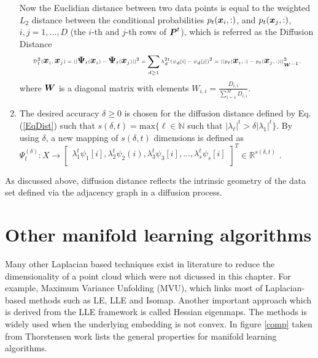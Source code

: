 \begin{enumerate}
{Now the Euclidian distance between two data points is equal to the weighted $L_2$ distance between the conditional probabilities ${{p}_t({\mbox{\boldmath $x$}}_i,:)}$, and ${{p}_t({\mbox{\boldmath $x$}}_j,:)}$, $i,j=1,...,D$ (the $i$-th and $j$-th rows of ${\mbox{\boldmath $P$}}^t$), which is referred as the Diffusion Distance
			\begin{equation}{ \label{EqDist} { {\cal{D}}^2_t( \myvec{x}_i,\myvec{x}_j)=||{\mymat{\Psi}_t{(\myvec{x}_i)}}-{\mymat{\Psi}_t{(\myvec{x}_j)}}||^2={  \sum_{d\geq{1}} {\lambda}^{2t}_d (\psi_d[i]-\psi_d[j])^2 }}=\\
			||{p_t}(\myvec{x}_i,:)-{p_t}(\myvec{x}_j,:)||^2_{\tiny\mymat{W}^{-1}}},
			\end{equation}
			where ${\mbox{\boldmath $W$}}$ is a diagonal matrix with elements
			$W_{i,i}=\frac{D_{i,i}}{\sum_{i=1}^M D_{i,i}}$.}
	\item{The desired accuracy $\delta \geq 0$ is chosen for the diffusion distance defined by Eq. (\ref{EqDist}) such that
		$s(\delta,t)=\text{max} \{\ell\in \mathbb{N}$  such that   $|\lambda_{\ell}|^t > \delta |\lambda_1|^t \}  $. By using $\delta$, a new mapping
		of $s(\delta,t)$ dimensions is defined as \\ \begin{math} {\Psi^{(\delta)}_t :  X \rightarrow \begin{bmatrix}
			{ \lambda_1^{t}\psi_1[i]} , { \lambda_2^{t}\psi_2(i)} , {
				\lambda_3^{t}\psi_3[i]} , {.} {.} {.}   ,
			
			{\lambda_{s}^{t}\psi_{s}[i]}\\
			
			\end{bmatrix}^T \in \mathbb{R}^{s(\delta,t)}} \end{math} .  }
\end{enumerate}

As discussed above, diffusion distance reflects the intrinsic geometry of the data set defined via the adjacency graph in a diffusion process.

\section{Other manifold learning algorithms}

Many other Laplacian based techniques exist in literature to reduce the dimensionality of a point cloud which were not dicussed in this chapter. For example, Maximum Variance Unfolding (MVU)\citep{Ety2008}, which links most of Laplacian-based methods such as LE, LLE and Isomap. Another important approach which is derived from the LLE framework is called Hessian eigenmaps\citep{Ety2008}. The methods is widely used when the underlying embedding is not convex. In figure \ref{comp} taken from Thorstensen work \citep{Thor2009} lists the general properties for manifold learning algorithms.


